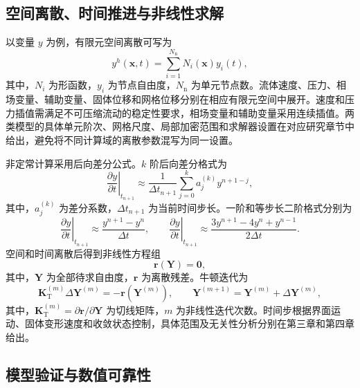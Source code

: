 \subsection{空间离散、时间推进与非线性求解}

以变量 $y$ 为例，有限元空间离散可写为
\begin{equation}
y^h(\boldsymbol{x},t)
=
\sum_{i=1}^{N_{\mathrm n}}
N_i(\boldsymbol{x})y_i(t),
\label{eq:ch2_fe_interpolation}
\end{equation}
其中，$N_i$ 为形函数，$y_i$ 为节点自由度，$N_{\mathrm n}$ 为单元节点数。流体速度、压力、相场变量、辅助变量、固体位移和网格位移分别在相应有限元空间中展开。速度和压力插值需满足不可压缩流动的稳定性要求，相场变量和辅助变量采用连续插值。两类模型的具体单元阶次、网格尺度、局部加密范围和求解器设置在对应研究章节中给出，避免将不同计算域的离散参数混写为同一设置。

非定常计算采用后向差分公式。$k$ 阶后向差分格式为
\begin{equation}
\left.
\frac{\partial y}{\partial t}
\right|_{t_{n+1}}
\approx
\frac{1}{\Delta t_{n+1}}
\sum_{j=0}^{k}
a_j^{(k)}y^{n+1-j},
\label{eq:ch2_bdf_general}
\end{equation}
其中，$a_j^{(k)}$ 为差分系数，$\Delta t_{n+1}$ 为当前时间步长。一阶和等步长二阶格式分别为
\begin{equation}
\left.
\frac{\partial y}{\partial t}
\right|_{t_{n+1}}
\approx
\frac{y^{n+1}-y^n}{\Delta t},
\qquad
\left.
\frac{\partial y}{\partial t}
\right|_{t_{n+1}}
\approx
\frac{3y^{n+1}-4y^n+y^{n-1}}{2\Delta t}.
\label{eq:ch2_bdf_examples}
\end{equation}
空间和时间离散后得到非线性方程组
\begin{equation}
\boldsymbol{r}(\boldsymbol{Y})
=
\boldsymbol{0},
\label{eq:ch2_discrete_residual}
\end{equation}
其中，$\boldsymbol{Y}$ 为全部待求自由度，$\boldsymbol{r}$ 为离散残差。牛顿迭代为
\begin{equation}
\boldsymbol{K}_{\mathrm T}^{(m)}
\Delta\boldsymbol{Y}^{(m)}
=
-\boldsymbol{r}\!\left(\boldsymbol{Y}^{(m)}\right),
\qquad
\boldsymbol{Y}^{(m+1)}
=
\boldsymbol{Y}^{(m)}
+
\Delta\boldsymbol{Y}^{(m)},
\label{eq:ch2_newton_iteration}
\end{equation}
其中，$\boldsymbol{K}_{\mathrm T}^{(m)}=\partial\boldsymbol{r}/\partial\boldsymbol{Y}$ 为切线矩阵，$m$ 为非线性迭代次数。时间步根据界面运动、固体变形速度和收敛状态控制，具体范围及无关性分析分别在第三章和第四章给出。

\subsection{模型验证与数值可靠性}


